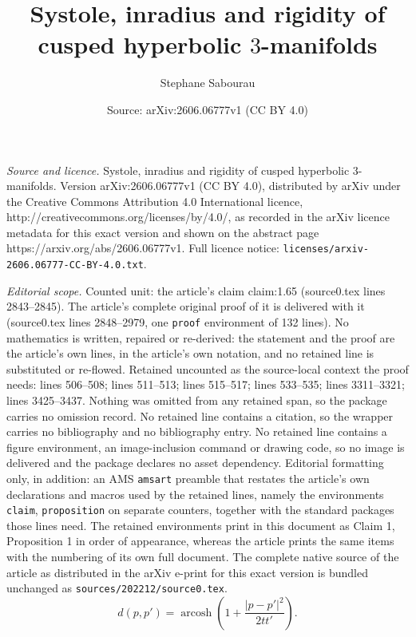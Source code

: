 \documentclass[10pt,a4paper]{amsart}
\title{Systole, inradius and rigidity of cusped hyperbolic $3$-manifolds}
\author{Stephane Sabourau}
\date{Source: arXiv:2606.06777v1 (CC BY 4.0)}
\DeclareMathOperator{\arcosh}{arcosh}
\begin{document}
\maketitle

\noindent\emph{Source and licence.} Systole, inradius and rigidity of cusped hyperbolic $3$-manifolds. Version arXiv:2606.06777v1 (CC BY 4.0), distributed by arXiv under the Creative Commons Attribution 4.0 International licence, http://creativecommons.org/licenses/by/4.0/, as recorded in the arXiv licence metadata for this exact version and shown on the abstract page https://arxiv.org/abs/2606.06777v1. Full licence notice: \texttt{licenses/arxiv-2606.06777-CC-BY-4.0.txt}.\par\smallskip

\noindent\textit{Editorial scope.} Counted unit: the article's claim claim:1.65 (source0.tex lines 2843--2845). The article's complete original proof of it is delivered with it (source0.tex lines 2848--2979, one \texttt{proof} environment of 132 lines). No mathematics is written, repaired or re-derived: the statement and the proof are the article's own lines, in the article's own notation, and no retained line is substituted or re-flowed.  Retained uncounted as the source-local context the proof needs: lines 506--508; lines 511--513; lines 515--517; lines 533--535; lines 3311--3321; lines 3425--3437.  Nothing was omitted from any retained span, so the package carries no omission record.  No retained line contains a citation, so the wrapper carries no bibliography and no bibliography entry.  No retained line contains a figure environment, an image-inclusion command or drawing code, so no image is delivered and the package declares no asset dependency.  Editorial formatting only, in addition: an AMS \texttt{amsart} preamble that restates the article's own declarations and macros used by the retained lines, namely the environments \texttt{claim}, \texttt{proposition} on separate counters, together with the standard packages those lines need.  The retained environments print in this document as Claim 1, Proposition 1 in order of appearance, whereas the article prints the same items with the numbering of its own full document.  The complete native source of the article as distributed in the arXiv e-print for this exact version is bundled unchanged as \texttt{sources/202212/source0.tex}.
\begin{equation} \label{eq:hyp-eucl} 
d(p,p') = \arcosh \left( 1+ \frac{|p-p'|^2}{2 tt'} \right).
\end{equation}
\end{document}
